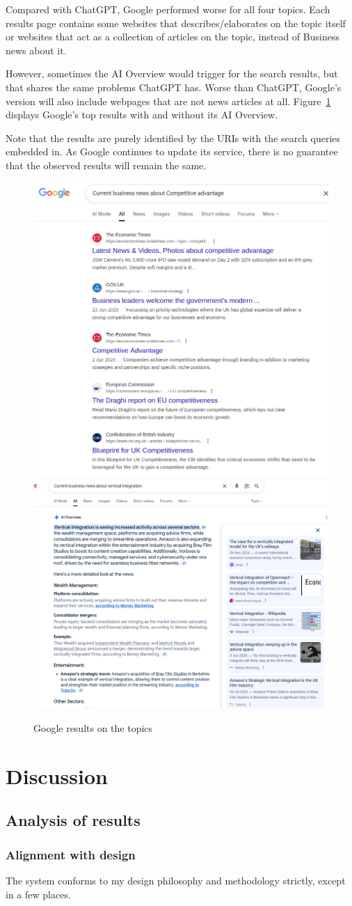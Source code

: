 \documentclass[final-report]{report-template}
\begin{document}
Compared with ChatGPT, Google performed worse for all four topics. Each
results page contains some websites that describes/elaborates on the topic
itself or websites that act as a collection of articles on the topic, instead
of Business news about it. 

However, sometimes the AI Overview would trigger for the search results, but
that shares the same problems ChatGPT has. Worse than ChatGPT, Google's version
will also include webpages that are not news articles at all.
Figure~\ref{fig.results.google} displays Google's top results with and without
its AI Overview.

Note that the results are purely identified by the URIs with the search queries
embedded in. As Google continues to update its service, there is no guarantee
that the observed results will remain the same.

\begin{figure}[hbtp!]
	\centering
	\includegraphics[width=.3\textwidth]{res/google_res1.png}
	\includegraphics[width=.5\textwidth]{res/google_res2.png}
	\caption{Google results on the topics}
	\label{fig.results.google}
\end{figure}


\section{Discussion}
\subsection{Analysis of results}
\subsubsection{Alignment with design}
The system conforms to my design philosophy and methodology strictly, except
in a few places. 
\end{document}

